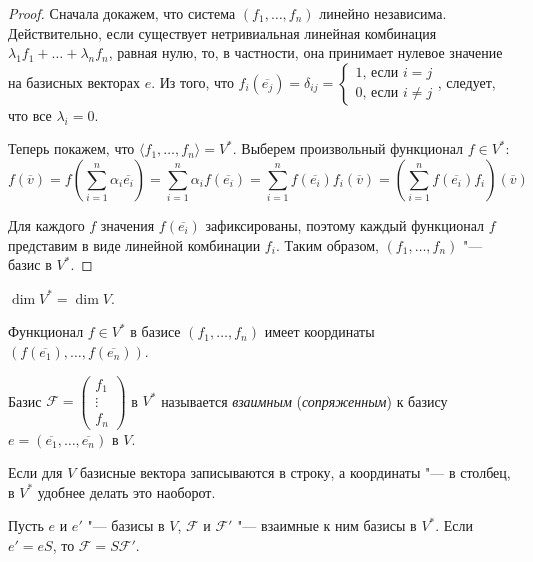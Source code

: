 \begin{proof}
	Сначала докажем, что система $(f_1, \dots, f_n)$ линейно независима. Действительно, если существует нетривиальная линейная комбинация $\lambda_1f_1 + \dots + \lambda_nf_n$, равная нулю, то, в частности, она принимает нулевое значение на базисных векторах $e$. Из того, что $f_i(\overline{e_j}) = \delta_{ij} = \begin{cases}1\text{, если }i = j\\0\text{, если }i \ne j\end{cases}$, следует, что все $\lambda_i = 0$.
	
	Теперь покажем, что $\langle f_1, \dots, f_n\rangle = V^*$. Выберем произвольный функционал $f \in V^*$:
	\[f(\overline{v}) = f\left(\sum_{i = 1}^n\alpha_i\overline{e_i}\right) = \sum_{i = 1}^n\alpha_if(\overline{e_i}) =  \sum_{i = 1}^nf(\overline{e_i})f_i(\overline{v}) = \left(\sum_{i = 1}^nf(\overline{e_i})f_i\right)(\overline{v})\]
	
	Для каждого $f$ значения $f(\overline{e_i})$ зафиксированы, поэтому каждый функционал $f$ представим в виде линейной комбинации $f_i$. Таким образом, $(f_1, \dots, f_n)$ "--- базис в $V^*$.
\end{proof}

\begin{corollary}
	$\dim{V^*} = \dim{V}$.
\end{corollary}

\begin{corollary}
	Функционал $f \in V^*$ в базисе $(f_1, \dots, f_n)$ имеет координаты $(f(\overline{e_1}), \dots, f(\overline{e_n}))$.
\end{corollary}

\begin{definition}
	Базис $\mathcal{F} = \begin{pmatrix}
	f_1\\\vdots\\f_n
	\end{pmatrix}$ в $V^*$ называется \textit{взаимным} (\textit{сопряженным}) к базису $e = (\overline{e_1}, \dots, \overline{e_n})$ в $V$.
\end{definition}

\begin{note}
	Если для $V$ базисные вектора записываются в строку, а координаты "--- в столбец, в $V^*$ удобнее делать это наоборот.
\end{note}

\begin{proposition}
	Пусть $e$ и $e'$ "--- базисы в $V$, $\mathcal{F}$ и $\mathcal{F}'$ "--- взаимные к ним базисы в $V^*$. Если $e' = eS$, то $\mathcal{F} = S\mathcal{F}'$.
\end{proposition}

